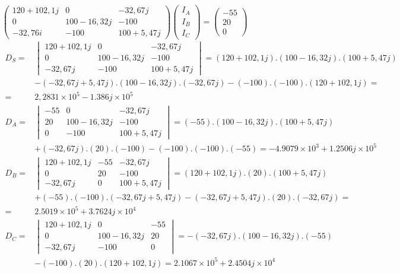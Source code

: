 $
\begin{pmatrix}
    120 + 102,1j & 0 & -32,67j \\
    0 & 100 - 16,32j & -100 \\
    -32,76i & -100 & 100 + 5,47j
\end{pmatrix}
\begin{pmatrix}
    I_A \\ I_B \\ I_C
\end{pmatrix}
=
\begin{pmatrix}
    -55 \\
    20 \\
    0
\end{pmatrix}
$
\begin{align*}
    D_S = 
    &\begin{vmatrix}
    120 + 102,1j & 0 & -32,67j \\
    0 & 100 - 16,32j & -100 \\
    -32,67j & -100 & 100 + 5,47j
    \end{vmatrix}
    = (120 + 102,1j).(100 - 16,32j).(100 + 5,47j) \\
    & - (-32,67j + 5,47j).(100 - 16,32j).(-32,67j) - (-100).(-100).(120 + 102,1j) = \\
    =& 2,2831 \times 10^{5} - 1.386j \times 10^{5} \\
    D_A = 
    &\begin{vmatrix}
    -55 & 0 & -32,67j \\
    20 & 100 - 16,32j & -100 \\
    0 & -100 & 100 + 5,47j
    \end{vmatrix}
    = (-55).(100 - 16,32j).(100 + 5,47j) \\
    &+ (-32,67j).(20).(-100) - (-100).(-100).(-55) = -4.9079 \times 10^3 + 1.2506j \times 10^5 \\
    D_B = 
    &\begin{vmatrix}
    120 + 102,1j & -55 & -32,67j \\
    0 & 20 & -100 \\
    -32,67j & 0 & 100 + 5,47j
    \end{vmatrix}
    = (120 + 102,1j).(20).(100 + 5,47j) \\
    &+ (-55).(-100).(-32,67j + 5,47j) - (-32,67j + 5,47j).(20).(-32,67j) = \\
    = &2.5019 \times 10^5 + 3.7624j \times 10^4 \\
    D_C = 
    &\begin{vmatrix}
    120 + 102,1j & 0 & -55 \\
    0 & 100 - 16,32j & 20 \\
    -32,67j & -100 & 0 
    \end{vmatrix}
    = -(-32,67j).(100 - 16,32j).(-55) \\
    &- (-100).(20).(120 + 102,1j) = 2.1067 \times 10^5 + 2.4504j \times 10^4 
\end{align*}
